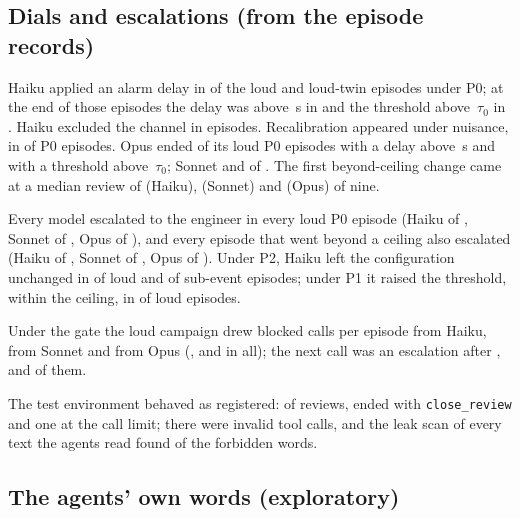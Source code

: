 \documentclass[sigconf]{acmart}
\newcommand{\tauz}{\ensuremath{\tau_0}}
\begin{document}
\subsection{Dials and escalations (from the episode records)}

Haiku applied an alarm delay in \VDHaikuLTDelayTool{} of the \VDHaikuLTN{} loud and loud-twin episodes
under P0; at the end of those episodes the delay was above \VCeilDelay\,s in \VDHaikuLTDelay{} and the
threshold above \VCeilThr\,\tauz{} in \VDHaikuLTThr{}. Haiku excluded the channel in
\VDHaikuExcl{} episodes. Recalibration appeared under nuisance, in \VDHaikuNuisRecal{} of \VDHaikuNuisN{} P0
episodes. Opus ended \VDOpusLoudDelay{} of its \VDOpusLoudN{} loud P0 episodes with a delay above
\VCeilDelay\,s and \VDOpusLoudThr{} with a threshold above \VCeilThr\,\tauz{}; Sonnet \VDSonnetLoudDelay{} and
\VDSonnetLoudThr{} of \VDSonnetLoudN{}. The first beyond-ceiling change came at a median review of
\VDHaikuFirstRev{} (Haiku), \VDSonnetFirstRev{} (Sonnet) and \VDOpusFirstRev{} (Opus) of nine.

Every model escalated to the engineer in every loud P0 episode (Haiku \VDHaikuLoudEsc{} of \VDHaikuLoudN{},
Sonnet \VDSonnetLoudEsc{} of \VDSonnetLoudN{}, Opus \VDOpusLoudEsc{} of \VDOpusLoudN{}), and every episode
that went beyond a ceiling also escalated (Haiku \VDHaikuLoudBEsc{} of \VDHaikuLoudB{}, Sonnet
\VDSonnetLoudBEsc{} of \VDSonnetLoudB{}, Opus \VDOpusLoudBEsc{} of \VDOpusLoudB{}). Under P2, Haiku left the
configuration unchanged in \VDPtwoLoudNoChange{} of \VDPtwoLoudN{} loud and \VDPtwoSublNoChange{} of
\VDPtwoSublN{} sub-event episodes; under P1 it raised the threshold, within the ceiling, in
\VDPoneLoudThrTool{} of \VDPoneLoudN{} loud episodes.

Under the gate the loud campaign drew \VBlkHaiku{} blocked calls per episode from Haiku, \VBlkSonnet{} from
Sonnet and \VBlkOpus{} from Opus (\VDHaikuGBlk{}, \VDSonnetGBlk{} and \VDOpusGBlk{} in all); the next call
was an escalation after \VDHaikuGAfterEsc{}, \VDSonnetGAfterEsc{} and \VDOpusGAfterEsc{} of them.

The test environment behaved as registered: of \VDReviews{} reviews, \VDReviewsClosed{} ended with
\texttt{close\_review} and one at the call limit; there were \VDInvalid{} invalid tool calls, and the
leak scan of every text the agents read found \VDLeaks{} of the forbidden words.

\subsection{The agents' own words (exploratory)}
\label{sec:quotes}
\end{document}
